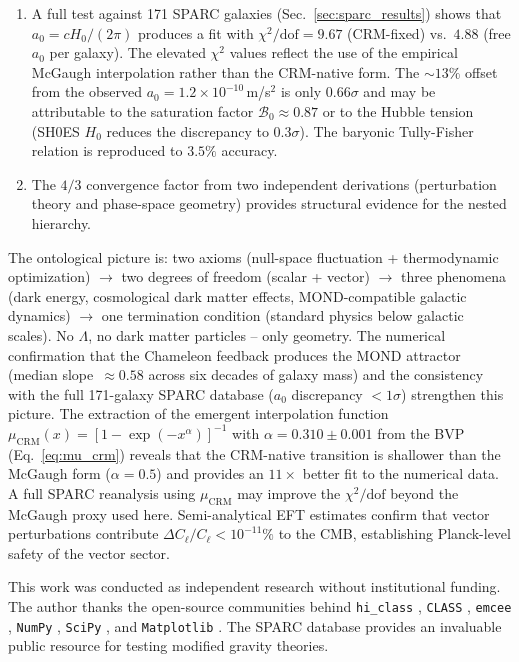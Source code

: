 \documentclass[aps,prd,twocolumn,superscriptaddress,nofootinbib]{revtex4-2}
\begin{document}
\begin{enumerate}
\item A full test against 171 SPARC galaxies (Sec.~\ref{sec:sparc_results}) shows that $a_0 = cH_0/(2\pi)$ produces a fit with $\chi^2/\mathrm{dof} = 9.67$ (CRM-fixed) vs.\ $4.88$ (free $a_0$ per galaxy). The elevated $\chi^2$ values reflect the use of the empirical McGaugh interpolation rather than the CRM-native form. The $\sim 13\%$ offset from the observed $a_0 = 1.2 \times 10^{-10}$\,m/s$^2$ is only $0.66\sigma$ and may be attributable to the saturation factor $\mathcal{B}_0 \approx 0.87$ or to the Hubble tension (SH0ES $H_0$ reduces the discrepancy to $0.3\sigma$). The baryonic Tully-Fisher relation is reproduced to $3.5\%$ accuracy.

\item The $4/3$ convergence factor from two independent derivations (perturbation theory and phase-space geometry) provides structural evidence for the nested hierarchy.
\end{enumerate}

The ontological picture is: two axioms (null-space fluctuation + thermodynamic optimization) $\to$ two degrees of freedom (scalar + vector) $\to$ three phenomena (dark energy, cosmological dark matter effects, MOND-compatible galactic dynamics) $\to$ one termination condition (standard physics below galactic scales). No $\Lambda$, no dark matter particles -- only geometry. The numerical confirmation that the Chameleon feedback produces the MOND attractor (median slope~$\approx 0.58$ across six decades of galaxy mass) and the consistency with the full 171-galaxy SPARC database ($a_0$ discrepancy $< 1\sigma$) strengthen this picture. The extraction of the emergent interpolation function $\mu_{\mathrm{CRM}}(x) = [1 - \exp(-x^\alpha)]^{-1}$ with $\alpha = 0.310 \pm 0.001$ from the BVP (Eq.~\ref{eq:mu_crm}) reveals that the CRM-native transition is shallower than the McGaugh form ($\alpha = 0.5$) and provides an $11\times$ better fit to the numerical data. A full SPARC reanalysis using $\mu_{\mathrm{CRM}}$ may improve the $\chi^2/\mathrm{dof}$ beyond the McGaugh proxy used here. Semi-analytical EFT estimates confirm that vector perturbations contribute $\Delta C_\ell/C_\ell < 10^{-11}\%$ to the CMB, establishing Planck-level safety of the vector sector.


\begin{acknowledgments}
This work was conducted as independent research without institutional funding. The author thanks the open-source communities behind \texttt{hi\_class} \cite{Zumalacarregui2017}, \texttt{CLASS} \cite{Blas2011}, \texttt{emcee} \cite{ForemanMackey2013}, \texttt{NumPy} \cite{Harris2020}, \texttt{SciPy} \cite{Virtanen2020}, and \texttt{Matplotlib} \cite{Hunter2007}. The SPARC database \cite{Lelli2016} provides an invaluable public resource for testing modified gravity theories.
\end{acknowledgments}
\end{document}
